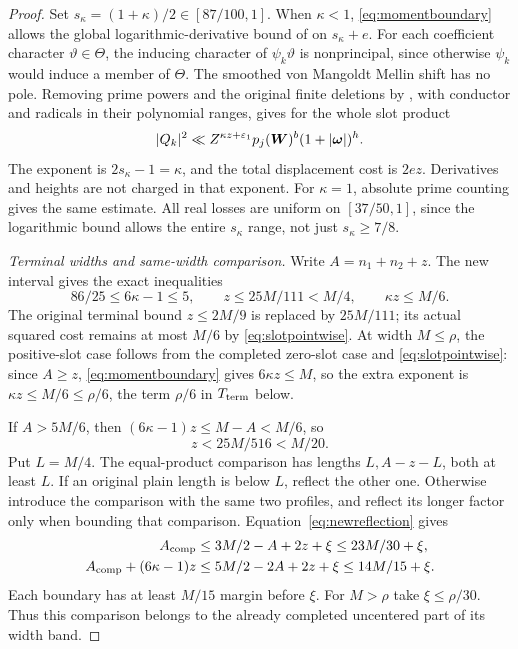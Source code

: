 \begin{proof}
Set $s_\kappa=(1+\kappa)/2\in[87/100,1]$. When $\kappa<1$, \eqref{eq:momentboundary} allows the global logarithmic-derivative bound of  on $s_\kappa+e$. For each coefficient character $\vartheta\in\Theta$, the inducing character of $\psi_k\vartheta$ is nonprincipal, since otherwise $\psi_k$ would induce a member of $\Theta$. The smoothed von Mangoldt Mellin shift has no pole. Removing prime powers and the original finite deletions by , with conductor and radicals in their polynomial ranges, gives for the whole slot product
\begin{equation}\label{eq:slotpointwise}
 |Q_k|^2\ll Z^{\kappa z+\varepsilon_1}p_j(\boldsymbol W)^b
                   (1+|\boldsymbol\omega|)^h.
\end{equation}
The exponent is $2s_\kappa-1=\kappa$, and the total displacement cost is $2ez$. Derivatives and heights are not charged in that exponent. For $\kappa=1$, absolute prime counting gives the same estimate. All real losses are uniform on $[37/50,1]$, since the logarithmic bound allows the entire $s_\kappa$ range, not just $s_\kappa\ge7/8$.

\emph{Terminal widths and same-width comparison.}
Write $A=n_1+n_2+z$. The new interval gives the exact inequalities
\begin{equation}\label{eq:kappaguards}
 86/25\le6\kappa-1\le5,\qquad
 z\le25M/111<M/4,\qquad \kappa z\le M/6.
\end{equation}
The original terminal bound $z\le2M/9$ is replaced by $25M/111$; its actual squared cost remains at most $M/6$ by \eqref{eq:slotpointwise}. At width $M\le\rho$, the positive-slot case follows from the completed zero-slot case and \eqref{eq:slotpointwise}: since $A\ge z$, \eqref{eq:momentboundary} gives $6\kappa z\le M$, so the extra exponent is $\kappa z\le M/6\le\rho/6$, the term $\rho/6$ in $T_{\rm term}$ below.

If $A>5M/6$, then $(6\kappa-1)z\le M-A<M/6$, so
\[
 z<25M/516<M/20.
\]
Put $L=M/4$. The equal-product comparison has lengths $L,A-z-L$, both at least $L$. If an original plain length is below $L$, reflect the other one. Otherwise introduce the comparison with the same two profiles, and reflect its longer factor only when bounding that comparison. Equation~\eqref{eq:newreflection} gives
\begin{align}
 A_{\rm comp}&\le3M/2-A+2z+\xi\le23M/30+\xi,\label{eq:comparison1}\\
 A_{\rm comp}+(6\kappa-1)z
 &\le5M/2-2A+2z+\xi\le14M/15+\xi.\label{eq:comparison2}
\end{align}
Each boundary has at least $M/15$ margin before $\xi$. For $M>\rho$ take $\xi\le\rho/30$. Thus this comparison belongs to the already completed uncentered part of its width band.


\end{proof}
